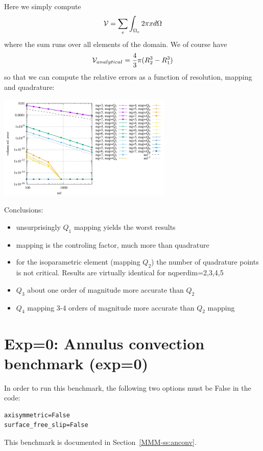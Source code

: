Here we simply compute 
\[
{\cal V} = \sum_e \int_{\Omega_e} 2\pi x d\Omega
\]
where the sum runs over all elements of the domain.
We of course have 
\[
{\cal V}_{analytical} = \frac43 \pi (R_2^3-R_1^3)
\]
so that we can compute the relative errors as a function of resolution, mapping and quadrature: 
\begin{center}
\includegraphics[width=8.3cm]{python_codes/fieldstone_152/RESULTS/vols/volumes.pdf}
\end{center}

\noindent Conclusions:
\begin{itemize}
\item unsurprisingly $Q_1$ mapping yields the worst results
\item mapping is the controling factor, much more than quadrature
\item for the isoparametric element (mapping $Q_2$) the number of quadrature points 
is not critical. Results are virtually identical for {\python nqperdim=2,3,4,5}
\item $Q_3$ about one order of magnitude more accurate than $Q_2$ 
\item $Q_4$ mapping 3-4 orders of magnitude more accurate than $Q_2$ mapping
\end{itemize}

\newpage
\section*{Exp=0: Annulus convection benchmark (exp=0)}

In order to run this benchmark, the following two options must be False in the code:
\begin{lstlisting}
axisymmetric=False
surface_free_slip=False
\end{lstlisting}

This benchmark is documented in Section~\ref{MMM-ss:anconv}.

